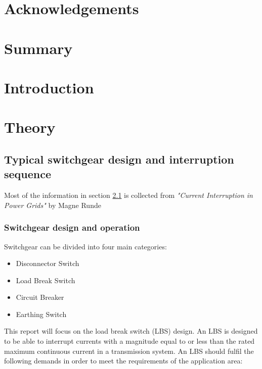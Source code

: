 \documentclass[10pt,a4paper,twoside]{article}
\begin{document}
\thispagestyle{empty}
\cleardoublepage
\section*{Acknowledgements}
\setcounter{page}{1}

\cleardoublepage
\section*{Summary}

\cleardoublepage
\setcounter{page}{1}
\tableofcontents
\cleardoublepage

\section{Introduction}

\cleardoublepage

\section{Theory}
\subsection{Typical switchgear design and interruption sequence} \label{sec:genDes}
Most of the information in section \ref{sec:genDes} is collected from \textit{"Current Interruption in Power Grids"} by Magne Runde \cite{bib:HVEbreak} \newline

\subsubsection{Switchgear design and operation} \label{sec:InterruptCurrent}
Switchgear can be divided into four main categories:
\begin{itemize}
\item Disconnector Switch
\item Load Break Switch
\item Circuit Breaker
\item Earthing Switch
\end{itemize}

This report will focus on the load break switch (LBS) design. An LBS is designed to be able to interrupt currents with a magnitude equal to or less than the rated maximum continuous current in a transmission system. An LBS should fulfil the following demands in order to meet the requirements of the application area:
\end{document}
